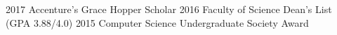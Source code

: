   \begin{cvskills} 
  	\cvskill
		{2017}
		{Accenture's Grace Hopper Scholar}
	\cvskill
		{2016}
		{Faculty of Science Dean's List (GPA 3.88/4.0)}
	\cvskill
		{2015}
		{Computer Science Undergraduate Society Award}
  \end{cvskills}
